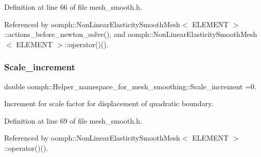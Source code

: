 Definition at line 66 of file mesh\+\_\+smooth.\+h.



Referenced by oomph\+::\+Non\+Linear\+Elasticity\+Smooth\+Mesh$<$ E\+L\+E\+M\+E\+N\+T $>$\+::actions\+\_\+before\+\_\+newton\+\_\+solve(), and oomph\+::\+Non\+Linear\+Elasticity\+Smooth\+Mesh$<$ E\+L\+E\+M\+E\+N\+T $>$\+::operator()().

\mbox{\label{namespaceoomph_1_1Helper__namespace__for__mesh__smoothing_aba8998d13da8e9dc69ad0a2e2d59f215}} 
\subsubsection{\texorpdfstring{Scale\+\_\+increment}{Scale\_increment}}
{\footnotesize\ttfamily double oomph\+::\+Helper\+\_\+namespace\+\_\+for\+\_\+mesh\+\_\+smoothing\+::\+Scale\+\_\+increment =0.}



Increment for scale factor for displacement of quadratic boundary. 



Definition at line 69 of file mesh\+\_\+smooth.\+h.



Referenced by oomph\+::\+Non\+Linear\+Elasticity\+Smooth\+Mesh$<$ E\+L\+E\+M\+E\+N\+T $>$\+::operator()().

